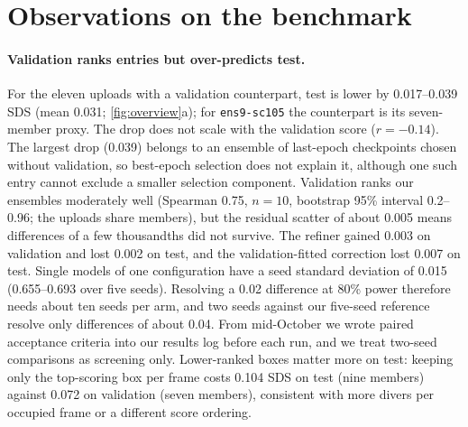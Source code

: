 \documentclass[10pt,twocolumn,letterpaper]{article}
\newcommand{\sds}{\mbox{SDS}}
\begin{document}
\section{Observations on the benchmark}
\label{sec:lessons}
\paragraph{Validation ranks entries but over-predicts test.}
For the eleven uploads with a validation counterpart, test is lower by 0.017--0.039 \sds{} (mean 0.031; \cref{fig:overview}a); for \texttt{ens9-sc105} the counterpart is its seven-member proxy.
The drop does not scale with the validation score ($r=-0.14$).
The largest drop (0.039) belongs to an ensemble of last-epoch checkpoints chosen without validation, so best-epoch selection does not explain it, although one such entry cannot exclude a smaller selection component.
Validation ranks our ensembles moderately well (Spearman 0.75, $n=10$, bootstrap 95\% interval 0.2--0.96; the uploads share members), but the residual scatter of about 0.005 means differences of a few thousandths did not survive.
The refiner gained 0.003 on validation and lost 0.002 on test, and the validation-fitted correction lost 0.007 on test.
Single models of one configuration have a seed standard deviation of 0.015 (0.655--0.693 over five seeds).
Resolving a 0.02 difference at 80\% power therefore needs about ten seeds per arm, and two seeds against our five-seed reference resolve only differences of about 0.04.
From mid-October we wrote paired acceptance criteria into our results log before each run, and we treat two-seed comparisons as screening only.
Lower-ranked boxes matter more on test: keeping only the top-scoring box per frame costs 0.104 \sds{} on test (nine members) against 0.072 on validation (seven members), consistent with more divers per occupied frame or a different score ordering.
\end{document}
